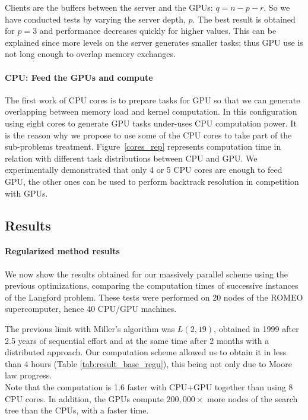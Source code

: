 Clients are the buffers between the server and the GPUs: 
$q = n - p- r$.
So we have conducted tests by varying the server depth, $p$. The best result is obtained for $p=3$ and performance decreases quickly for higher values. This can be explained since more levels on the server generates smaller tasks; thus GPU use is not long enough to overlap memory exchanges.

\paragraph{CPU: Feed the GPUs and compute}
The first work of CPU cores is to prepare tasks for GPU so that we can generate overlapping between memory load and kernel computation. 
In this configuration using eight cores to generate GPU tasks under-uses CPU computation power. 
It is the reason why we propose to use some of the CPU cores to take part of the sub-problems treatment. 
Figure~\ref{cores_rep} represents computation time in relation with different task distributions between CPU and GPU.
We experimentally demonstrated that only 4 or 5 CPU cores are enough to feed GPU, the other ones can be used to perform backtrack resolution in competition with GPUs.

\subsection{Results}

\paragraph{Regularized method results}
We now show the results obtained for our massively parallel scheme using the previous optimizations, comparing the computation times of successive instances of the Langford problem. 
These tests were performed on 20 nodes of the ROMEO supercomputer, hence 40 CPU/GPU machines.

The previous limit with Miller's algorithm was $L(2,19)$, obtained in 1999 after 2.5 years of sequential effort and at the same time after 2 months with a distributed approach\cite{Mil00}. 
Our computation scheme allowed us to obtain it in less than 4 hours (Table \ref{tab:result_base_regu}), this being not only due to Moore law progress.\\
Note that the computation is 1.6 faster with CPU+GPU together than using 8 CPU cores. 
In addition, the GPUs compute $200,000\times$ more nodes of the search tree than the CPUs, with a faster time.

